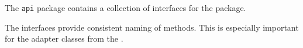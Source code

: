 The \texttt{api} package contains a collection of interfaces for the \texttt{} package.

The interfaces provide consistent naming of methods. This is especially important for the adapter classes from the
\texttt{}.
